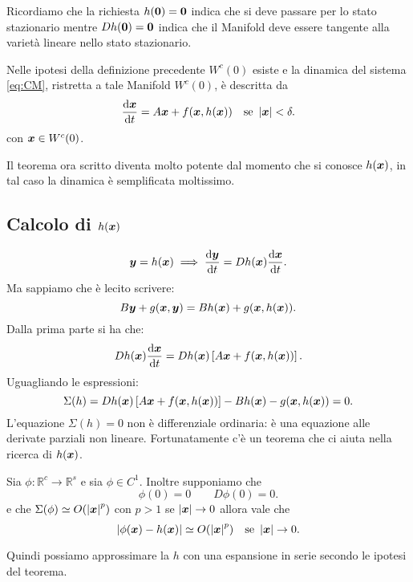 \noindent
Ricordiamo che la richiesta $h(\boldsymbol{0}) = \boldsymbol{0}$ indica che si deve passare per lo stato stazionario mentre $Dh(\boldsymbol{0}) = \boldsymbol{0}$ indica che il Manifold deve essere tangente alla varietà lineare nello stato stazionario.
\begin{thm}
    Nelle ipotesi della definizione precedente $W^c(0)$ esiste e la dinamica del sistema \ref{eq:CM}, ristretta a tale Manifold $W^c(0)$, è descritta da 
    \[
	\frac{\text{d} \v{x}}{\text{d} t} = A\v{x} + f(\v{x}, h(\v{x})) \quad  \text{se} \ \left|\v{x}\right|<\delta
    .\] 
    con $\boldsymbol{x}\in W^c(0)$.
\end{thm}
\noindent
Il teorema ora scritto diventa molto potente dal momento che si conosce $h(\boldsymbol{x})$, in tal caso la dinamica è semplificata moltissimo.
\subsection{Calcolo di $h(\boldsymbol{x})$}%
\[
    \boldsymbol{y} = h(\boldsymbol{x}) \implies  \frac{\text{d} \boldsymbol{y}}{\text{d} t} = Dh(\boldsymbol{x}) \frac{\text{d} \boldsymbol{x}}{\text{d} t} 
.\] 
Ma sappiamo che è lecito scrivere:
\[
    B\boldsymbol{y}+g(\boldsymbol{x}, \boldsymbol{y}) = Bh(\boldsymbol{x}) + g(\boldsymbol{x}, h(\boldsymbol{x}) ) 
.\] 
Dalla prima parte si ha che:
\[
    Dh(\boldsymbol{x}) \frac{\text{d} \boldsymbol{x}}{\text{d} t} = Dh(\boldsymbol{x}) \left[A\boldsymbol{x}+ f(\boldsymbol{x}, h(\boldsymbol{x}) ) \right]
.\] 
Uguagliando le espressioni:
\[
    \Sigma (h) =   Dh(\boldsymbol{x})\left[A\boldsymbol{x}+ f(\boldsymbol{x}, h(\boldsymbol{x}))\right]-Bh(\boldsymbol{x}) - g(\boldsymbol{x}, h(\boldsymbol{x})) = 0
.\] 
L'equazione $\Sigma (h) = 0$ non è differenziale ordinaria: è una equazione alle derivate parziali non lineare. Fortunatamente c'è un teorema che ci aiuta nella ricerca di $h(\boldsymbol{x})$.
\begin{thm}[]
    Sia $\phi :\mathbb{R}^c\to \mathbb{R}^s$ e sia $\phi  \in C^1$. Inoltre supponiamo che 
    \[
	\phi (0) = 0 \qquad  D\phi (0) = 0 
    .\] 
    e che $\Sigma (\phi) \simeq O(\left|\boldsymbol{x}\right|^p)$ con $p>1$ se $\left|\boldsymbol{x}\right|\to 0$ allora vale che
    \[
	\left|\phi (\boldsymbol{x}) -h(\boldsymbol{x}) \right| \simeq O(\left|\boldsymbol{x}\right|^p) \quad  \text{se } \left|\boldsymbol{x}\right|\to 0
    .\] 
\end{thm}
\noindent
Quindi possiamo approssimare la $h$  con una espansione in serie secondo le ipotesi del teorema.

